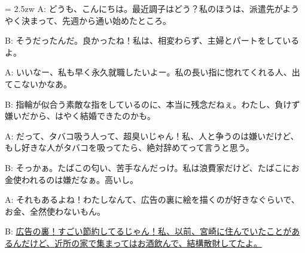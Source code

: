 \documentclass[11pt]{amsart}
\title{}
\author{}
\newenvironment{hangall}[1]{\hangindent = 2.5zw\everypar{\hangindent = 2.5zw}}{}
\begin{document}
\maketitle
\begin{hangall}{}%
A: どうも、こんにちは。最近調子はどう？私のほうは、派遣先がようやく決まって、先週から通い始めたところ。

B: そうだったんだ。良かったね！私は、相変わらず、主婦とパートをしているよ。

A: いいなー、私も早く永久就職したいよー。私の長い指に惚れてくれる人、出てこないかなあ。

B: 指輪が似合う素敵な指をしているのに、本当に残念だねぇ。わたし、負けず嫌いだから、はやく結婚できたのかも。

A: だって、タバコ吸う人って、超臭いじゃん！私、人と争うのは嫌いだけど、もし好きな人がタバコを吸ってたら、絶対辞めてって言うと思う。

B: そっかぁ。たばこの匂い、苦手なんだっけ。私は浪費家だけど、たばこにお金使われるのは嫌だなぁ。高いし。

A: それもあるよね！わたしなんて、広告の裏に絵を描くのが好きなぐらいで、お金、全然使わないもん。

B: \ul{広告の裏！すごい節約してるじゃん！私、以前、宮崎に住んでいたことがあるんだけど、近所の家で集まってはお酒飲んで、結構散財してたよ。}\end{hangall}
\end{document}
